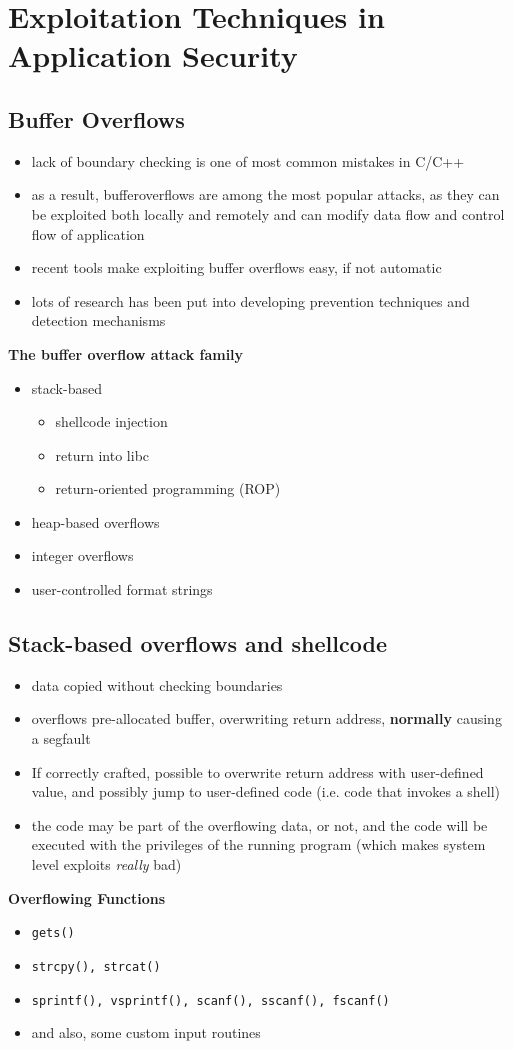 \documentclass{article}
\begin{document}
\section{Exploitation Techniques in Application Security}
\subsection{Buffer Overflows}
\begin{itemize}
    \item lack of boundary checking is one of most common mistakes in C/C++
    \item as a result, bufferoverflows are among the most popular attacks, as they can be exploited both locally and remotely and can modify data flow and control flow of application
    \item recent tools make exploiting buffer overflows easy, if not automatic
    \item lots of research has been put into developing prevention techniques and detection mechanisms
\end{itemize}
\textbf{The buffer overflow attack family}
\begin{itemize}
    \item stack-based
    \begin{itemize}
        \item shellcode injection
        \item return into libc
        \item return-oriented programming (ROP)
    \end{itemize}
    \item heap-based overflows
    \item integer overflows
    \item user-controlled format strings
\end{itemize}
\subsection{Stack-based overflows and shellcode}
\begin{itemize}
    \item data copied without checking boundaries
    \item overflows pre-allocated buffer, overwriting return address, \textbf{normally} causing a segfault
    \item If correctly crafted, possible to overwrite return address with user-defined value, and possibly jump to user-defined code (i.e. code that invokes a shell)
    \item the code may be part of the overflowing data, or not, and the code will be executed with the privileges of the running program (which makes system level exploits \textit{really} bad)
\end{itemize}
\textbf{Overflowing Functions}
\begin{itemize}
    \item \verb|gets()|
    \item \verb|strcpy(), strcat()|
    \item \verb|sprintf(), vsprintf(), scanf(), sscanf(), fscanf()|
    \item and also, some custom input routines
\end{itemize}
\end{document}
